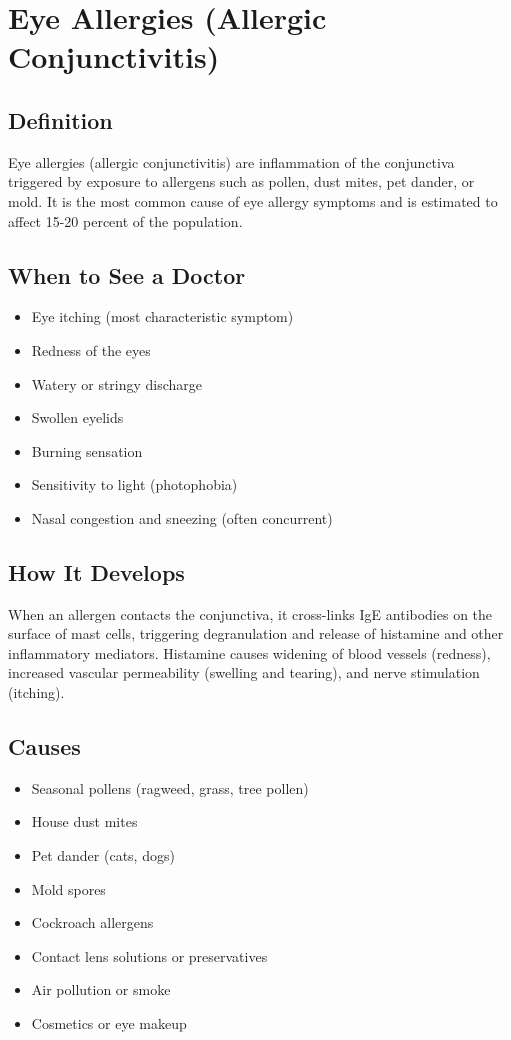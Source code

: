\chapter{Eye Allergies (Allergic Conjunctivitis)}

\section*{Definition}
Eye allergies (allergic conjunctivitis) are inflammation of the conjunctiva triggered by exposure to allergens such as pollen, dust mites, pet dander, or mold. It is the most common cause of eye allergy symptoms and is estimated to affect 15-20 percent of the population.

\section*{When to See a Doctor}
\begin{itemize}
\item Eye itching (most characteristic symptom)
\item Redness of the eyes
\item Watery or stringy discharge
\item Swollen eyelids
\item Burning sensation
\item Sensitivity to light (photophobia)
\item Nasal congestion and sneezing (often concurrent)
\end{itemize}

\section*{How It Develops}
When an allergen contacts the conjunctiva, it cross-links IgE antibodies on the surface of mast cells, triggering degranulation and release of histamine and other inflammatory mediators. Histamine causes widening of blood vessels (redness), increased vascular permeability (swelling and tearing), and nerve stimulation (itching).

\section*{Causes}
\begin{itemize}
\item Seasonal pollens (ragweed, grass, tree pollen)
\item House dust mites
\item Pet dander (cats, dogs)
\item Mold spores
\item Cockroach allergens
\item Contact lens solutions or preservatives
\item Air pollution or smoke
\item Cosmetics or eye makeup
\end{itemize}

